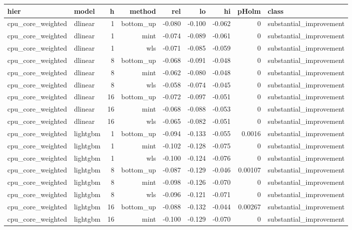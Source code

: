 \begin{tabular}{llrrrrrrl}
\hline
hier & model & h & method & rel & lo & hi & pHolm & class \\
\hline
cpu_core_weighted & dlinear & 1 & bottom_up & -0.080 & -0.100 & -0.062 & 0 & substantial_improvement \\
cpu_core_weighted & dlinear & 1 & mint & -0.074 & -0.089 & -0.061 & 0 & substantial_improvement \\
cpu_core_weighted & dlinear & 1 & wls & -0.071 & -0.085 & -0.059 & 0 & substantial_improvement \\
cpu_core_weighted & dlinear & 8 & bottom_up & -0.068 & -0.091 & -0.048 & 0 & substantial_improvement \\
cpu_core_weighted & dlinear & 8 & mint & -0.062 & -0.080 & -0.048 & 0 & substantial_improvement \\
cpu_core_weighted & dlinear & 8 & wls & -0.058 & -0.074 & -0.045 & 0 & substantial_improvement \\
cpu_core_weighted & dlinear & 16 & bottom_up & -0.072 & -0.097 & -0.051 & 0 & substantial_improvement \\
cpu_core_weighted & dlinear & 16 & mint & -0.068 & -0.088 & -0.053 & 0 & substantial_improvement \\
cpu_core_weighted & dlinear & 16 & wls & -0.065 & -0.082 & -0.051 & 0 & substantial_improvement \\
cpu_core_weighted & lightgbm & 1 & bottom_up & -0.094 & -0.133 & -0.055 & 0.0016 & substantial_improvement \\
cpu_core_weighted & lightgbm & 1 & mint & -0.102 & -0.128 & -0.075 & 0 & substantial_improvement \\
cpu_core_weighted & lightgbm & 1 & wls & -0.100 & -0.124 & -0.076 & 0 & substantial_improvement \\
cpu_core_weighted & lightgbm & 8 & bottom_up & -0.087 & -0.129 & -0.046 & 0.00107 & substantial_improvement \\
cpu_core_weighted & lightgbm & 8 & mint & -0.098 & -0.126 & -0.070 & 0 & substantial_improvement \\
cpu_core_weighted & lightgbm & 8 & wls & -0.096 & -0.121 & -0.071 & 0 & substantial_improvement \\
cpu_core_weighted & lightgbm & 16 & bottom_up & -0.088 & -0.132 & -0.044 & 0.00267 & substantial_improvement \\
cpu_core_weighted & lightgbm & 16 & mint & -0.100 & -0.129 & -0.070 & 0 & substantial_improvement \\

\end{tabular}
